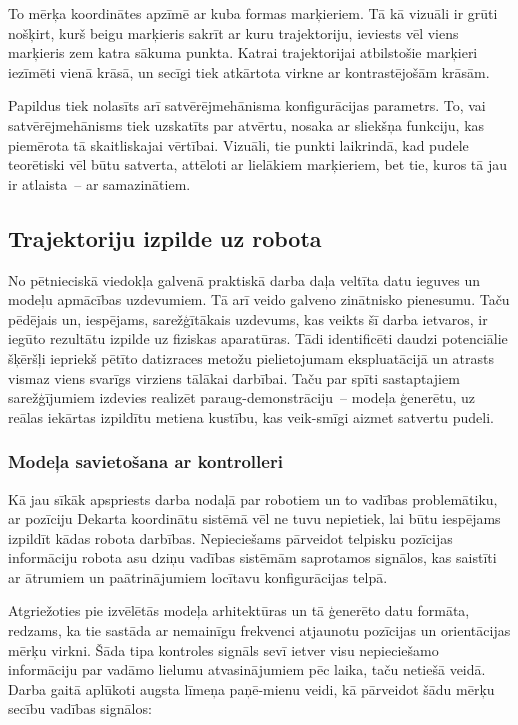 \documentclass[12pt, a4paper]{article}
\numberwithin{equation}{section} %
\begin{document}
To mērķa koordinātes apzīmē ar kuba formas marķieriem. Tā kā vizuāli ir grūti nošķirt, kurš beigu marķieris sakrīt ar kuru trajektoriju, ieviests vēl viens marķieris zem katra sākuma punkta. Katrai trajektorijai atbilstošie marķieri iezīmēti vienā krāsā, un secīgi tiek atkārtota virkne ar kontrastējošām krāsām. 

Papildus tiek nolasīts arī satvērējmehānisma konfigurācijas parametrs. To, vai satvērējmehānisms tiek uzskatīts par atvērtu, nosaka ar sliekšņa funkciju, kas piemērota tā skaitliskajai vērtībai. Vizuāli, tie punkti laikrindā, kad pudele teorētiski vēl būtu satverta, attēloti ar lielākiem marķieriem, bet tie, kuros tā jau ir atlaista~-- ar samazinātiem.
 

\subsection{Trajektoriju izpilde uz robota}

No pētnieciskā viedokļa galvenā praktiskā darba daļa veltīta datu ieguves un modeļu apmācības uzdevumiem. Tā arī veido galveno zinātnisko pienesumu. Taču pēdējais un, iespējams, sarežģītākais uzdevums, kas veikts šī darba ietvaros, ir iegūto rezultātu izpilde uz fiziskas aparatūras. Tādi identificēti daudzi potenciālie šķēršļi iepriekš pētīto datizraces metožu pielietojumam ekspluatācijā un atrasts vismaz viens svarīgs virziens tālākai darbībai. Taču par spīti sastaptajiem sarežģījumiem izdevies realizēt paraug-demonstrāciju~-- modeļa ģenerētu, uz reālas iekārtas izpildītu metiena kustību, kas veik-smīgi aizmet satvertu pudeli.

\subsubsection{Modeļa savietošana ar kontrolleri}

Kā jau sīkāk apspriests darba nodaļā par robotiem un to vadības problemātiku, ar pozīciju Dekarta koordinātu sistēmā vēl ne tuvu nepietiek, lai būtu iespējams izpildīt kādas robota darbības. Nepieciešams pārveidot telpisku pozīcijas informāciju robota asu dziņu vadības sistēmām saprotamos signālos, kas saistīti ar ātrumiem un paātrinājumiem locītavu konfigurācijas telpā. 

Atgriežoties pie izvēlētās modeļa arhitektūras un tā ģenerēto datu formāta, redzams, ka tie sastāda ar nemainīgu frekvenci atjaunotu pozīcijas un orientācijas mērķu virkni. Šāda tipa kontroles signāls sevī ietver visu nepieciešamo informāciju par vadāmo lielumu atvasinājumiem pēc laika, taču netiešā veidā. Darba gaitā aplūkoti augsta līmeņa paņē-mienu veidi, kā pārveidot šādu mērķu secību vadības signālos:
\end{document}
